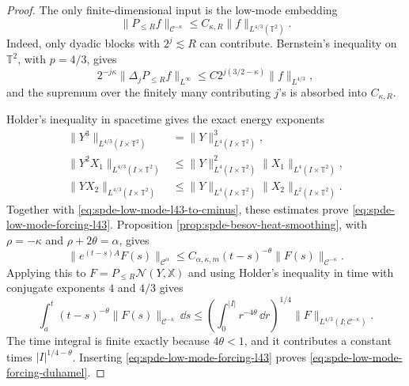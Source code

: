\begin{proof}
The only finite-dimensional input is the low-mode embedding
\begin{equation}
  \|P_{\leq R}f\|_{\mathcal C^{-\kappa}}
  \leq
  C_{\kappa,R}\|f\|_{L^{4/3}(\mathbb T^2)} .
  \label{eq:spde-low-mode-l43-to-cminus}
\end{equation}
Indeed, only dyadic blocks with \(2^j\lesssim R\) can contribute.  Bernstein's
inequality on \(\mathbb T^2\), with \(p=4/3\), gives
\[
  2^{-j\kappa}\|\Delta_jP_{\leq R}f\|_{L^\infty}
  \leq
  C2^{j(3/2-\kappa)}\|f\|_{L^{4/3}},
\]
and the supremum over the finitely many contributing \(j\)'s is absorbed into
\(C_{\kappa,R}\).

Holder's inequality in spacetime gives the exact energy exponents
\[
\begin{aligned}
  \|Y^3\|_{L^{4/3}(I\times\mathbb T^2)}
    &=\|Y\|_{L^4(I\times\mathbb T^2)}^3,\\
  \|Y^2X_1\|_{L^{4/3}(I\times\mathbb T^2)}
    &\leq
    \|Y\|_{L^4(I\times\mathbb T^2)}^2
    \|X_1\|_{L^4(I\times\mathbb T^2)},\\
  \|YX_2\|_{L^{4/3}(I\times\mathbb T^2)}
    &\leq
    \|Y\|_{L^4(I\times\mathbb T^2)}
    \|X_2\|_{L^2(I\times\mathbb T^2)} .
\end{aligned}
\]
Together with \eqref{eq:spde-low-mode-l43-to-cminus}, these estimates prove
\eqref{eq:spde-low-mode-forcing-l43}.  Proposition
\ref{prop:spde-besov-heat-smoothing}, with \(\rho=-\kappa\) and
\(\rho+2\theta=\alpha\), gives
\[
  \|e^{(t-s)A}F(s)\|_{\mathcal C^\alpha}
  \leq
  C_{\alpha,\kappa,m}(t-s)^{-\theta}
  \|F(s)\|_{\mathcal C^{-\kappa}} .
\]
Applying this to \(F=P_{\leq R}\mathcal N(Y,\mathbb X)\) and using Holder's
inequality in time with conjugate exponents \(4\) and \(4/3\) gives
\[
  \int_a^t
    (t-s)^{-\theta}
    \|F(s)\|_{\mathcal C^{-\kappa}}\,\dd s
  \leq
  \left(\int_0^{|I|}r^{-4\theta}\,\dd r\right)^{1/4}
  \|F\|_{L^{4/3}(I;\mathcal C^{-\kappa})}.
\]
The time integral is finite exactly because \(4\theta<1\), and it contributes
a constant times \(|I|^{1/4-\theta}\).  Inserting
\eqref{eq:spde-low-mode-forcing-l43} proves
\eqref{eq:spde-low-mode-forcing-duhamel}.
\end{proof}

